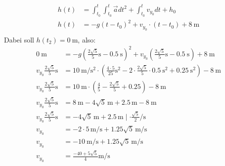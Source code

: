 \documentclass[sectionformat = aufgabe]{gadsescript}
\begin{document}
\begin{enumerate}[label=\alph*)]
		\begin{align*}
			h(t) &= \int_{t_0}^{t} \int_{t_0}^{t} \vec a dt^2 + \int_{t_0}^{t} v_{y_0} dt + h_0\\
			h(t) &= - g(t- t_0)^2 + v_{y_0} \cdot (t-t_0) + \qty{8}{\metre}\\
		\end{align*}
		Dabei soll $ h(t_2) = \qty{0}{\metre} $, also:
		\begin{align*}
			\qty{0}{\metre}  &= -g\left(\frac{2\sqrt{5}}{5}\unit{\second} - \qty{0.5}{\second} \right)^2 + v_{y_0} \left(\frac{2\sqrt{5}}{5}\unit{\second} - \qty{0.5}{\second} \right)  + \qty{8}{\metre} \\
			v_{y_0} \frac{2\sqrt{5}}{5}\unit{\second} &=%
			\qty{10}{\metre\per\square\second}\cdot\left(%
				\frac{4\cdot5}{25}\unit{\square\second} - 2\cdot\frac{2\sqrt{5}}{5}\cdot\qty{0.5}{\square\second} + \qty{0.25}{\square\second} \right)%
				- \qty{8}{\metre}\\
			v_{y_0} \frac{2\sqrt{5}}{5}\unit{\second} &= \qty{10}{\metre}\cdot\left(\frac{4}{5} - \frac{2\sqrt{5}}{5} + 0.25 \right)-  \qty{8}{\metre}\\
			v_{y_0} \frac{2\sqrt{5}}{5}\unit{\second} &= \qty{8}{\metre} - 4\sqrt{5}\,\unit{\metre} + 2.5\,\unit{\metre} -  \qty{8}{\metre}\\
			v_{y_0} \frac{2\sqrt{5}}{5}\unit{\second} &= - 4\sqrt{5}\,\unit{\metre} + 2.5\,\unit{\metre} \mid \cdot \frac{\sqrt{5}}{2}\unit{\per\second}\\
			v_{y_0} &=  - 2\cdot5\,\unit{\metre\per\second} + 1.25\sqrt{5}\,\unit{\metre\per\second} \\
			v_{y_0} &=  - \qty{10}{\metre\per\second} + 1.25\sqrt{5}\,\unit{\metre\per\second} \\
			v_{y_0} &=  \frac{- 40 + 5\sqrt{5}}{4}\unit{\metre\per\second} \\
		\end{align*}


\end{enumerate}
\end{document}
